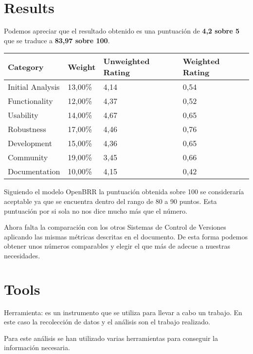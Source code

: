 \documentclass[11pt]{scrartcl}
\begin{document}
\section{Results}

Podemos apreciar que el resultado obtenido es una puntuaci\'on de \textbf{4,2 sobre 5} que se traduce a \textbf{83,97 sobre 100}.

\begin{tabular}{|l|l|l|l|}
    \hline {\bf Category} & {\bf Weight} & {\bf Unweighted Rating} & {\bf Weighted Rating}\\
    \hline Initial Analysis	 & 13,00\% & 4,14 & 0,54 \\
    \hline Functionality & 12,00\% & 4,37 & 0,52\\
    \hline Usability & 14,00\% & 4,67 & 0,65\\
    \hline Robustness & 17,00\% & 4,46 & 0,76\\
    \hline Development & 15,00\% & 4,36 & 0,65\\
    \hline Community & 19,00\% & 3,45 & 0,66\\
    \hline Documentation & 10,00\% & 4,15 & 0,42\\
    \hline
\end{tabular}

\par Siguiendo el modelo OpenBRR la puntuaci\'on obtenida sobre 100 se considerar\'ia aceptable ya que se encuentra dentro del rango de 80 a 90 puntos. Esta puntuaci\'on por si sola no nos dice mucho m\'as que el n\'umero.

\par Ahora falta la comparaci\'on con los otros Sistemas de Control de Versiones aplicando las mismas m\'etricas descritas en el documento. De esta forma podemos obtener unos n\'umeros comparables y elegir el que m\'as de adecue a nuestras necesidades.

\section{Tools}

\par Herramienta: es un instrumento que se utiliza para llevar a cabo un trabajo. En este caso la recolecci\'on de datos y el an\'alisis son el trabajo realizado.

\par Para este an\'alisis se han utilizado varias herramientas para conseguir la informaci\'on necesaria.
\end{document}
